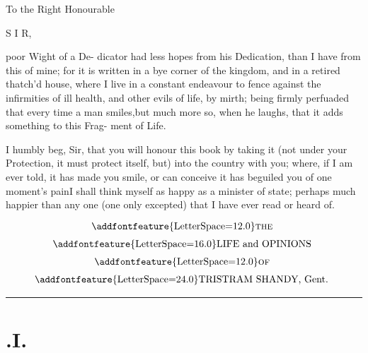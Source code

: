 \documentclass{article}
\begin{document}
\newpage
\null
\newpage
\pagestyle{dedication}
\thispagestyle{empty}
\centerline{\small To the Right Honourable}
\vfill
{}

\vfill

\bgroup
\fontsize{11}{15}\selectfont

\indent S I R,

 poor Wight of a De-\break
dicator had less hopes from\break
his Dedication, than I have from\break
this of mine; for it is written in\break
a bye corner of the kingdom, and\break
in a retired thatch'd house, where\break
I live in a constant endeavour to\break
fence against the infirmities of ill\break
health, and other evils of life, by
mirth; being firmly perfuaded that
every time a man smiles,\tsk but\break
much more so, when he laughs,\break
that it adds something to this Frag-\break
ment of Life.

I humbly beg, Sir, that you\break
will honour this book by taking\break
it \tsh (not under your Protection,\break
\tsh it must protect itself, but)\tsk\break
into the country with you; where,\break
if I am ever told, it has made\break
you smile, or can conceive it has\break
beguiled you of one moment's\break
pain\tsh I shall think myself as\break
happy as a minister of state;\tsh\break
perhaps much happier than any
one (one only excepted) that I have\break
ever read or heard of.

\bigskip

\egroup

\newpage\null
\thispagestyle{empty}
\newpage
\setcounter{page}{1}
\pagestyle{folio}
\thispagestyle{empty}
\[\vbox{\openup 6pt\halign{\hss # \hss\cr
\addfontfeature{LetterSpace=12.0}\textsc{the}\cr
\addfontfeature{LetterSpace=16.0}LIFE and OPINIONS\cr
\addfontfeature{LetterSpace=12.0}\textsc{of}\cr
{\addfontfeature{LetterSpace=24.0}TRISTRAM SHANDY}, Gent.\cr}}\]

\vskip 6pt
\hrule
\setlength{\baselineskip}{14pt}  %

\section{.\enspace I.}
\end{document}
